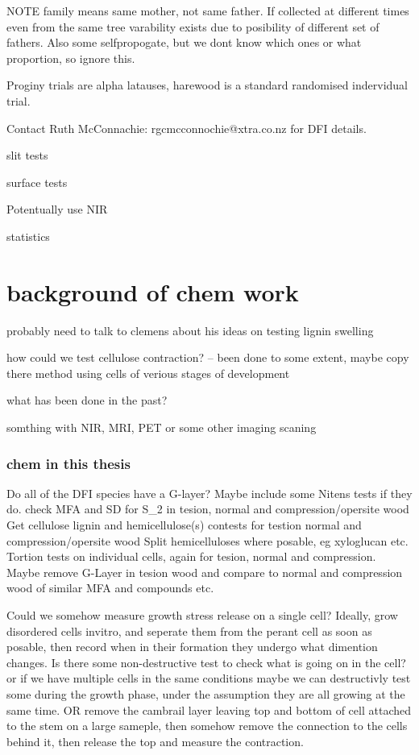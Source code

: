 \documentclass{article}
\begin{document}
NOTE family means same mother, not same father. If collected at different times even from the same tree varability exists due to posibility of different set of fathers. Also some selfpropogate, but we dont know which ones or what proportion, so ignore this.

Proginy trials are alpha latauses, harewood is a standard randomised indervidual trial.

Contact Ruth McConnachie: rgcmcconnochie@xtra.co.nz for DFI details.

slit tests

surface tests

Potentually use NIR

statistics

\section{background of chem work}

probably need to talk to clemens about his ideas on testing lignin swelling

how could we test cellulose contraction? -- been done to some extent, maybe copy there method using cells of verious stages of development

what has been done in the past?

somthing with NIR, MRI, PET or some other imaging scaning

\subsubsection{chem in this thesis}

Do all of the DFI species have a G-layer?
Maybe include some Nitens tests if they do.
check MFA and SD for S\_2 in tesion, normal and compression/opersite wood
Get cellulose lignin and hemicellulose(s) contests for testion normal and compression/opersite wood
    Split hemicelluloses where posable, eg xyloglucan etc.
Tortion tests on individual cells, again for tesion, normal and compression. Maybe remove G-Layer in tesion wood and compare to normal and compression wood of similar MFA and compounds etc.

Could we somehow measure growth stress release on a single cell?
Ideally, grow disordered cells invitro, and seperate them from the perant cell as soon as posable, then record when in their formation they undergo what dimention changes. Is there some non-destructive test to check what is going on in the cell? or if we have multiple cells in the same conditions maybe we can destructivly test some during the growth phase, under the assumption they are all growing at the same time.
OR
remove the cambrail layer leaving top and bottom of cell attached to the stem on a large sameple, then somehow remove the connection to the cells behind it, then release the top and measure the contraction.
\end{document}
